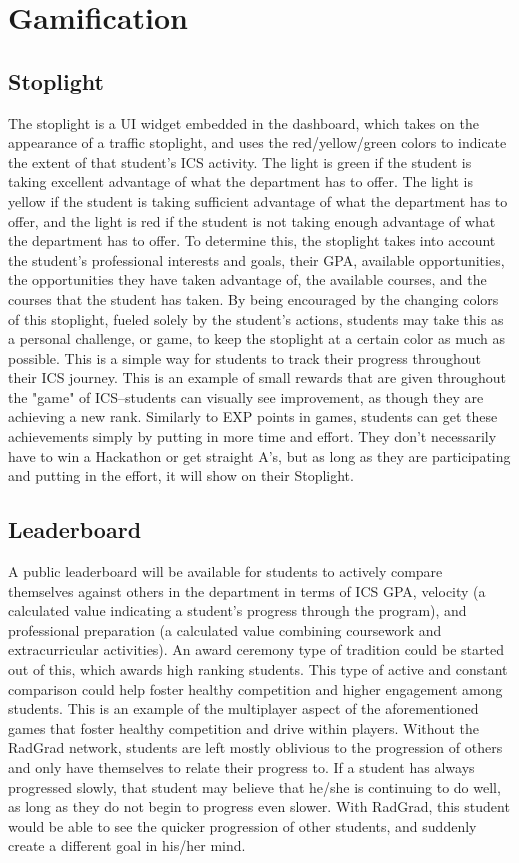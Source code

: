\section{Gamification}
\subsection{Stoplight}
The stoplight is a UI widget embedded in the dashboard, which takes on the appearance of a traffic stoplight, and uses the red/yellow/green colors to indicate the extent of that student's ICS activity. The light is green if the student is taking excellent advantage of what the department has to offer. The light is yellow if the student is taking sufficient advantage of what the department has to offer, and the light is red if the student is not taking enough advantage of what the department has to offer. To determine this, the stoplight takes into account the student's professional interests and goals, their GPA, available opportunities, the opportunities they have taken advantage of, the available courses, and the courses that the student has taken. By being encouraged by the changing colors of this stoplight, fueled solely by the student's actions, students may take this as a personal challenge, or game, to keep the stoplight at a certain color as much as possible. This is a simple way for students to track their progress throughout their ICS journey. This is an example of small rewards that are given throughout the "game" of ICS--students can visually see improvement, as though they are achieving a new rank. Similarly to EXP points in games, students can get these achievements simply by putting in more time and effort. They don't necessarily have to win a Hackathon or get straight A's, but as long as they are participating and putting in the effort, it will show on their Stoplight. 

\subsection{Leaderboard}
A public leaderboard will be available for students to actively compare themselves against others in the department in terms of ICS GPA, velocity (a calculated value indicating a student's progress through the program), and professional preparation (a calculated value combining coursework and extracurricular activities). An award ceremony type of tradition could be started out of this, which awards high ranking students. This type of active and constant comparison could help foster healthy competition and higher engagement among students. This is an example of the multiplayer aspect of the aforementioned games that foster healthy competition and drive within players. Without the RadGrad network, students are left mostly oblivious to the progression of others and only have themselves to relate their progress to. If a student has always progressed slowly, that student may believe that he/she is continuing to do well, as long as they do not begin to progress even slower. With RadGrad, this student would be able to see the quicker progression of other students, and suddenly create a different goal in his/her mind.

